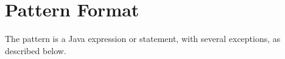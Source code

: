 \documentclass{article}
\begin{document}
\section{Pattern Format}

\label{pattern:format}

The pattern is a Java expression or statement, with several exceptions, as described
below.
\end{document}
